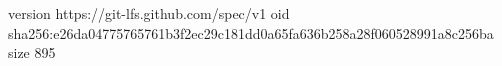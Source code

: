 version https://git-lfs.github.com/spec/v1
oid sha256:e26da04775765761b3f2ec29c181dd0a65fa636b258a28f060528991a8c256ba
size 895
